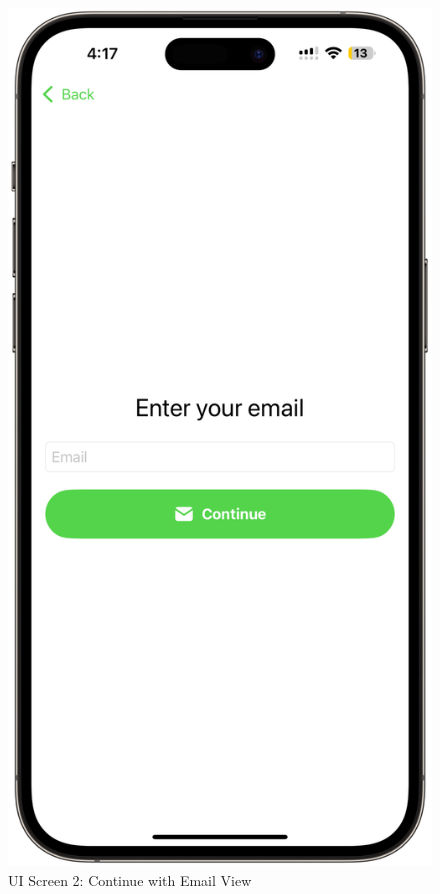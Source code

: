 \begin{figure}[!h]
\begin{minipage}{0.3\textwidth}
        \includegraphics[width=\textwidth]{images/screen2.png}
        \caption{UI Screen 2: Continue with Email View}
        \label{fig:ui-screen-2}
    \end{minipage}
\end{figure}

